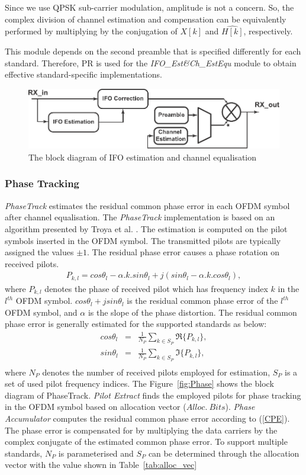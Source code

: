 Since we use QPSK sub-carrier modulation, amplitude is not a concern. So, the complex division of channel estimation and compensation can be equivalently performed by multiplying by the conjugation of $X[k]$ and $\hat{H[k]}$, respectively.

This module depends on the second preamble that is specified differently for each standard.
Therefore, PR is used for the \emph{IFO\_Est\&Ch\_EstEqu} module to obtain effective standard-specific implementations.
\begin{figure}
\centering
\includegraphics [width=0.7\columnwidth]{Figures/MSCR_RX_IFOCh.pdf}
\caption{The block diagram of IFO estimation and channel equalisation}
\label{fig:IFO}
\end{figure}

\subsubsection{Phase Tracking}
\emph{PhaseTrack} estimates the residual common phase error in each OFDM symbol after channel equalisation.
The \emph{PhaseTrack} implementation is based on an algorithm presented by Troya et al. \cite{Troya2007}.
The estimation is computed on the pilot symbols inserted in the OFDM symbol. The transmitted pilots are typically assigned
the values $\pm 1$. The residual phase error causes a phase rotation on received pilots.
\begin{eqnarray}
\label{PhaseTrack}
P_{k,l} = cos\theta_{l} -\alpha.k.sin \theta_{l} + j (sin\theta_{l} -\alpha.k.cos\theta_{l}),
\end{eqnarray}
where $P_{k,l}$ denotes the phase of received pilot which has frequency index $k$ in the $l^{th}$ OFDM symbol.
$cos\theta_{l} + j sin\theta_{l}$ is the residual common phase error of the $l^{th}$ OFDM symbol, and $\alpha$ is the slope of the phase distortion.
The residual common phase error is generally estimated for the supported standards as below:
\begin{eqnarray}
\label{CPE}
cos\theta_{l} &=& \frac{1}{N_P} \sum_{k \in S_P} \Re\{P_{k,l}\}, \\ \nonumber
sin\theta_{l} &=& \frac{1}{N_P} \sum_{k \in S_P} \Im\{P_{k,l}\}, \\ \nonumber
\end{eqnarray}
where $N_P$ denotes the number of received pilots employed for estimation, $S_P$ is a set of used pilot frequency indices.
The Figure~\ref{fig:Phase} shows the block diagram of PhaseTrack. \emph{Pilot Extract} finds the employed pilots for phase tracking in the OFDM symbol based on allocation vector ($Alloc.~Bits$).
\emph{Phase Accumulator} computes the residual common phase error according to (\ref{CPE}).
The phase error is compensated for by multiplying the data carriers by the complex conjugate of the estimated common phase error.
To support multiple standards, $N_P$ is parameterised and $S_P$ can be determined through the allocation vector with the value shown in Table~\ref{tab:alloc_vec}

